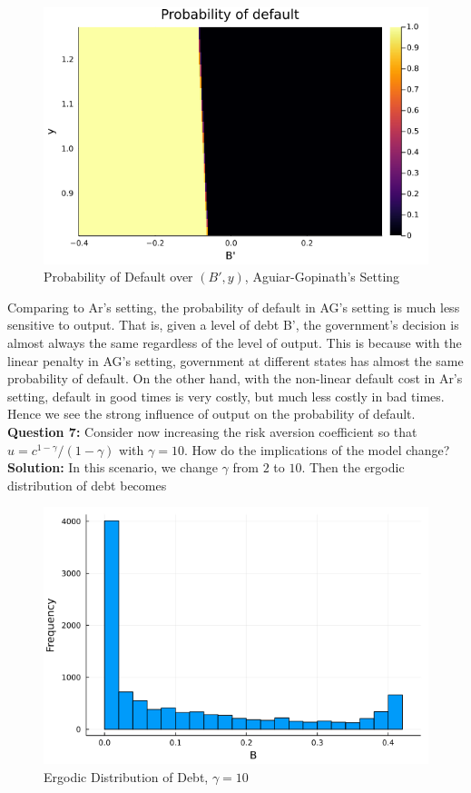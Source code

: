 \documentclass{article}
\begin{document}
	\begin{figure}[htbp]
		\centering
		\includegraphics[scale=0.4]{PofD_AG.png}
		\caption{Probability of Default over $(B',y)$, Aguiar-Gopinath's Setting}
	\end{figure}
	
	Comparing to Ar's setting, the probability of default in AG's setting is much less sensitive to output. That is, given a level of debt B', the government's decision is almost always the same regardless of the level of output. This is because with the linear penalty in AG's setting, government at different states has almost the same probability of default. On the other hand, with the non-linear default cost in Ar's setting, default in good times is very costly, but much less costly in bad times. Hence we see the strong influence of output on the probability of default. \\
	
	\noindent\textbf{Question 7:} Consider now increasing the risk aversion coefficient so that $u = c^{1 - \gamma}/(1 - \gamma)$ with $\gamma = 10$. How do the implications of the model change? \\
	
	\noindent\textbf{Solution:} In this scenario, we change $\gamma$ from $2$ to $10$. Then the ergodic distribution of debt becomes
	
	\begin{figure}[htbp]
		\centering
		\includegraphics[scale=0.5]{B_histQ7.png}
		\caption{Ergodic Distribution of Debt, $\gamma = 10$}
	\end{figure}
	
\end{document}
